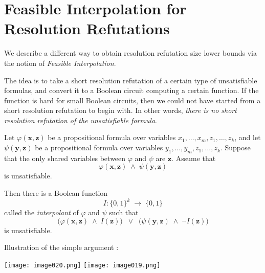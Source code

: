 \section{Feasible Interpolation for Resolution Refutations}
We describe a different way to obtain resolution refutation size lower bounds via the notion of \emph{Feasible Interpolation}. 

The idea is to take a short resolution refutation of a certain type of unsatisfiable formulas, and convert it to a Boolean circuit computing a certain function. If the function is hard for small Boolean circuits, then we could not have started from a short resolution refutation to begin with. In other words, \emph{there is no short resolution refutation of the unsatisfiable formula}.


\bigskip

\begin{theorem}
Let \(\varphi(\mathbf{x},\mathbf{z})\) be a propositional formula over variables \(x_{1},\dots,x_{m}, z_{1},\dots,z_{k}\), and let \(\psi(\mathbf{y},\mathbf{z})\) be a propositional formula over variables \(y_{1},\dots,y_{m}, z_{1},\dots,z_{k}\). 
Suppose that the only shared variables between \(\varphi\) and \(\psi\) are \(\mathbf{z}\). 
Assume that 
\[
\varphi(\mathbf{x},\mathbf{z}) \;\land\; \psi(\mathbf{y},\mathbf{z})
\]
is unsatisfiable.

Then there is a Boolean function 
\[
I \colon \{0,1\}^k \;\to\;\{0,1\}
\]
called the \emph{interpolant} of \(\varphi\) and \(\psi\) such that
\[
\bigl(\varphi(\mathbf{x},\mathbf{z}) \;\land\; I(\mathbf{z})\bigr)
\;\;\lor\;\;
\bigl(\psi(\mathbf{y},\mathbf{z}) \;\land\;\neg I(\mathbf{z})\bigr)
\]
is unsatisfiable.
\end{theorem}

Illustration of the simple argument :

\texttt{[image: image020.png]}
\texttt{[image: image019.png]}



